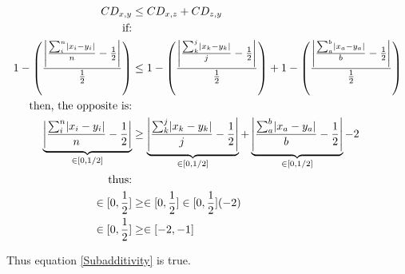\documentclass[12pt,letterpaper]{article}
\DeclarePairedDelimiter\abs{\lvert}{\rvert}%
\begin{document}
\begin{equation}
    \label{subadditivity_demo}
    \begin{aligned}
    CD_{x,y} &\leq CD_{x,z} + CD_{z,y}\\
    \text{if:}\\
    1 - \left(\frac{\abs*{\frac{\sum_{i}^{n}\abs{x_{i}-y_{i}}}{n}-\frac{1}{2}}}{\frac{1}{2}}\right)
     &\leq 
     1 - \left(\frac{\abs*{\frac{\sum_{k}^{j}\abs{x_{k}-y_{k}}}{j}-\frac{1}{2}}}{\frac{1}{2}}\right) 
     +
     1 - \left(\frac{\abs*{\frac{\sum_{a}^{b}\abs{x_{a}-y_{a}}}{b}-\frac{1}{2}}}{\frac{1}{2}}\right) \\
     \text{then, the opposite is:}\\
    \underbrace{\abs*{\frac{\sum_{i}^{n}\abs{x_{i}-y_{i}}}{n}-\frac{1}{2}} }_{\in[0,1/2]}
     &\geq 
     \underbrace{\abs*{\frac{\sum_{k}^{j}\abs{x_{k}-y_{k}}}{j}-\frac{1}{2}} }_{\in[0,1/2]}
     +
     \underbrace{\abs*{\frac{\sum_{a}^{b}\abs{x_{a}-y_{a}}}{b}-\frac{1}{2}} }_{\in[0,1/2]} - 2\\
     \text{thus:}\\
     \in[0,\frac{1}{2}] &\geq \in[0,\frac{1}{2}] \in[0,\frac{1}{2}] (-2) \\
     \in[0,\frac{1}{2}] &\geq \in[-2,-1]\\
    \end{aligned}
\end{equation}

Thus equation \ref{Subadditivity} is true.
\end{document}
